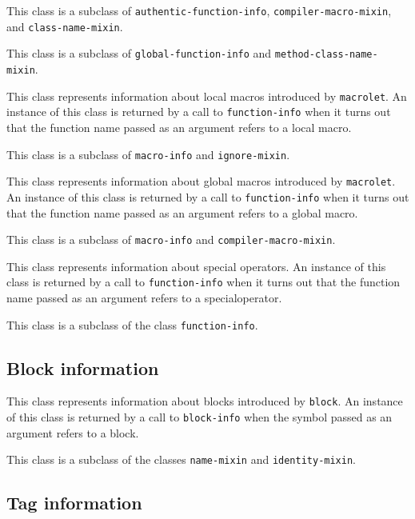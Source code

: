 This class is a subclass of \texttt{authentic-function-info},
\texttt{compiler-macro-mixin}, and \texttt{class-name-mixin}.


This class is a subclass of \texttt{global-function-info} and
\texttt{method-class-name-mixin}.



This class represents information about local macros introduced by
\texttt{macrolet}.  An instance of this class is returned by a call to
\texttt{function-info} when it turns out that the function name passed
as an argument refers to a local macro.

This class is a subclass of \texttt{macro-info} and \texttt{ignore-mixin}.


This class represents information about global macros introduced by
\texttt{macrolet}.  An instance of this class is returned by a call to
\texttt{function-info} when it turns out that the function name passed
as an argument refers to a global macro.

This class is a subclass of \texttt{macro-info} and \texttt{compiler-macro-mixin}.


This class represents information about special operators.  An
instance of this class is returned by a call to \texttt{function-info}
when it turns out that the function name passed as an argument refers
to a specialoperator.

This class is a subclass of the class \texttt{function-info}.

\subsection{Block information}


This class represents information about blocks introduced by
\texttt{block}.  An instance of this class is returned by a call to
\texttt{block-info} when the symbol passed as an argument refers to a
block.

This class is a subclass of the classes \texttt{name-mixin} and
\texttt{identity-mixin}.

\subsection{Tag information}

